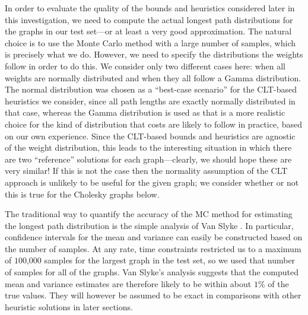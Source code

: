 \documentclass[12pt]{article}
\begin{document}
In order to evaluate the quality of the bounds and heuristics considered later in this investigation, we need to compute the actual longest path distributions for the graphs in our test set---or at least a very good approximation. The natural choice is to use the Monte Carlo method with a large number of samples, which is precisely what we do. However, we need to specify the distributions the weights follow in order to do this. We consider only two different cases here: when all weights are normally distributed and when they all follow a Gamma distribution. The normal distribution was chosen as a ``best-case scenario'' for the CLT-based heuristics we consider, since all path lengths are exactly normally distributed in that case, whereas the Gamma distribution is used as that is a more realistic choice for the kind of distribution that costs are likely to follow in practice, based on our own experience. Since the CLT-based bounds and heuristics are agnostic of the weight distribution, this leads to the interesting situation in which there are two ``reference'' solutions for each graph---clearly, we should hope these are very similar! If this is not the case then the normality assumption of the CLT approach is unlikely to be useful for the given graph; we consider whether or not this is true for the Cholesky graphs below.

The traditional way to quantify the accuracy of the MC method for estimating the longest path distribution is the simple analysis of Van Slyke \cite{van63}. In particular, confidence intervals for the mean and variance can easily be constructed based on the number of samples. At any rate, time constraints restricted us to a maximum of $100$,$000$ samples for the largest graph in the test set, so we used that number of samples for all of the graphs. Van Slyke's analysis suggests that the computed mean and variance estimates are therefore likely to be within about $1\%$ of the true values. They will however be assumed to be exact in comparisons with other heuristic solutions in later sections.
\end{document}

